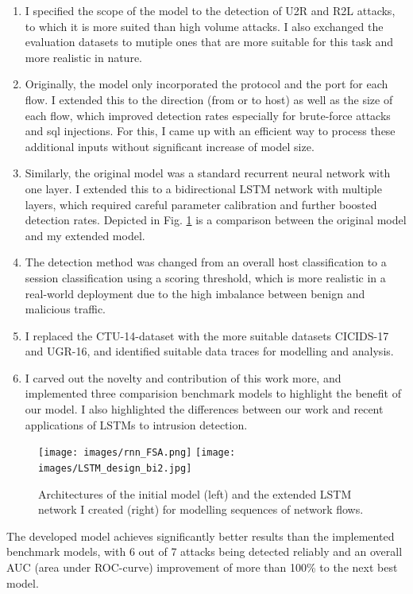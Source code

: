 \documentclass[a4paper,12pt,twoside]{article}
\begin{document}
\begin{enumerate}
\item I specified the scope of the model to the detection of U2R and R2L attacks, to which it is more suited than high volume attacks. I also exchanged the evaluation datasets to mutiple ones that are more suitable for this task and more realistic in nature.
\item Originally, the model only incorporated the protocol and the port for each flow. I extended this to the direction (from or to host) as well as the size of each flow, which improved detection rates especially for brute-force attacks and sql injections. For this, I came up with an efficient way to process these additional inputs without significant increase of model size.
\item Similarly, the original model was a standard recurrent neural network with one layer. I extended this to a bidirectional LSTM network with multiple layers, which required careful parameter calibration and further boosted detection rates. Depicted in Fig. \ref{fig:LSTM} is a comparison between the original model and my extended model.
\item The detection method was changed from an overall host classification to a session classification using a scoring threshold, which is more realistic in a real-world deployment due to the high imbalance between benign and malicious traffic.
\item I replaced the CTU-14-dataset with the more suitable datasets CICIDS-17 and UGR-16, and identified suitable data traces for modelling and analysis. 
\item I carved out the novelty and contribution of this work more, and implemented three comparision benchmark models to highlight the benefit of our model. I also highlighted the differences between our work and recent applications of LSTMs to intrusion detection.
\end{enumerate}

\begin{figure}
\centering

\texttt{[image: images/rnn\_FSA.png]}
\texttt{[image: images/LSTM\_design\_bi2.jpg]}
\caption{Architectures of the initial model (left) and the extended
LSTM network I created (right) for modelling sequences of network flows.}
\label{fig:LSTM}
\end{figure}

The developed model achieves significantly better results than the implemented benchmark models, with 6 out of 7 attacks being detected reliably and an overall AUC (area under ROC-curve) improvement of more than 100\% to the next best model.
\end{document}
